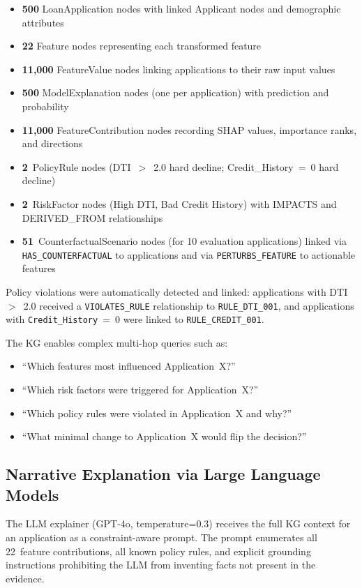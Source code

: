 \documentclass[lnbip]{svmultln}
\begin{document}
\begin{itemize}
    \item \textbf{500} LoanApplication nodes with linked Applicant nodes and demographic attributes
    \item \textbf{22} Feature nodes representing each transformed feature
    \item \textbf{11,000} FeatureValue nodes linking applications to their raw input values
    \item \textbf{500} ModelExplanation nodes (one per application) with prediction and probability
    \item \textbf{11,000} FeatureContribution nodes recording SHAP values, importance ranks, and directions
    \item \textbf{2}~PolicyRule nodes (DTI~$>$~2.0 hard decline; Credit\_History~=~0 hard decline)
    \item \textbf{2}~RiskFactor nodes (High DTI, Bad Credit History) with IMPACTS and DERIVED\_FROM relationships
    \item \textbf{51}~CounterfactualScenario nodes (for 10 evaluation applications) linked via \texttt{HAS\_COUNTERFACTUAL} to applications and via \texttt{PERTURBS\_FEATURE} to actionable features
\end{itemize}

Policy violations were automatically detected and linked: applications with DTI~$>$~2.0 received a \texttt{VIOLATES\_RULE} relationship to \texttt{RULE\_DTI\_001}, and applications with \texttt{Credit\_History}~=~0 were linked to \texttt{RULE\_CREDIT\_001}.

The KG enables complex multi-hop queries such as:
\begin{itemize}
    \item ``Which features most influenced Application~X?''
    \item ``Which risk factors were triggered for Application~X?''
    \item ``Which policy rules were violated in Application~X and why?''
    \item ``What minimal change to Application~X would flip the decision?''
\end{itemize}

\subsection{Narrative Explanation via Large Language Models}
The LLM explainer (GPT-4o, temperature=0.3) receives the full KG context for an application as a constraint-aware prompt. The prompt enumerates all 22~feature contributions, all known policy rules, and explicit grounding instructions prohibiting the LLM from inventing facts not present in the evidence.
\end{document}
